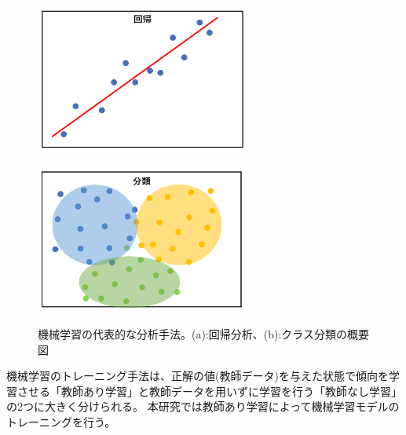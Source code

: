 \begin{figure}[tb]
  \centering
    \begin{minipage}[b]{0.4\linewidth}
        \centering
        \includegraphics[clip, width=7cm]{fig/4/regression.png}
        \vspace{10pt}
        \subcaption{}
        \label{fig:regre}
    \end{minipage}
    \hfill
    \begin{minipage}[b]{0.4\linewidth}
        \centering
        \includegraphics[clip, width=7cm]{fig/4/classification.png}
        \vspace{10pt}
        \subcaption{}
        \label{fig:class}
    \end{minipage}
  \caption{機械学習の代表的な分析手法。(a):回帰分析、(b):クラス分類の概要図}
  \label{fig:fit_def}
\end{figure}

機械学習のトレーニング手法は、正解の値(教師データ)を与えた状態で傾向を学習させる「教師あり学習」と教師データを用いずに学習を行う「教師なし学習」の2つに大きく分けられる。
本研究では教師あり学習によって機械学習モデルのトレーニングを行う。

